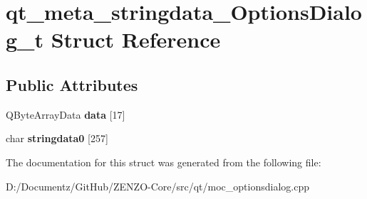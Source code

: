 \hypertarget{structqt__meta__stringdata___options_dialog__t}{}\section{qt\+\_\+meta\+\_\+stringdata\+\_\+\+Options\+Dialog\+\_\+t Struct Reference}
\label{structqt__meta__stringdata___options_dialog__t}
\subsection*{Public Attributes}
\begin{DoxyCompactItemize}
\item 
\mbox{\label{structqt__meta__stringdata___options_dialog__t_a87be06e4112cb44a3816ff5f41793685}} 
Q\+Byte\+Array\+Data {\bfseries data} \mbox{[}17\mbox{]}
\item 
\mbox{\label{structqt__meta__stringdata___options_dialog__t_a36860d621c0b68c04ae5142645f93306}} 
char {\bfseries stringdata0} \mbox{[}257\mbox{]}
\end{DoxyCompactItemize}


The documentation for this struct was generated from the following file\+:\begin{DoxyCompactItemize}
\item 
D\+:/\+Documentz/\+Git\+Hub/\+Z\+E\+N\+Z\+O-\/\+Core/src/qt/moc\+\_\+optionsdialog.\+cpp\end{DoxyCompactItemize}
